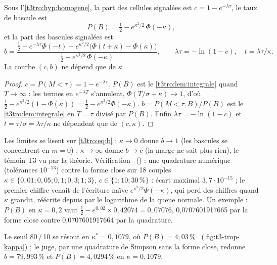 \begin{theoreme}\label{t3tro:thm:garde}
Sous l'\cref{t3tro:hyp:homogene}, la part des cellules signalées est $c = 1 - e^{-\lambda\tau}$, le taux de bascule est
\begin{equation}\label{t3tro:eq:pb}
P(B) = \tfrac12 - e^{\kappa^2/2}\,\Phi(-\kappa),
\end{equation}
et la part des bascules signalées est
\begin{equation}\label{t3tro:eq:b}
b = \frac{\tfrac12 - e^{-\lambda\tau}\Phi(-t) - e^{\kappa^2/2}\bigl(\Phi(t + \kappa) - \Phi(\kappa)\bigr)}{\tfrac12 - e^{\kappa^2/2}\,\Phi(-\kappa)}, \qquad \lambda\tau = -\ln(1 - c),\quad t = \lambda\tau/\kappa .
\end{equation}
La courbe $(c, b)$ ne dépend que de $\kappa$.
\end{theoreme}
\begin{proof}
$c = P(M < \tau) = 1 - e^{-\lambda\tau}$. $P(B)$ est le \cref{t3tro:lem:integrale} quand $T \to \infty$ : les termes en $e^{-\lambda T}$ s'annulent, $\Phi(T/\sigma + \kappa) \to 1$, d'où $\tfrac12 - e^{\kappa^2/2}(1 - \Phi(\kappa)) = \tfrac12 - e^{\kappa^2/2}\Phi(-\kappa)$. $b = P(M < \tau, B)/P(B)$ est le \cref{t3tro:lem:integrale} en $T = \tau$ divisé par $P(B)$. Enfin $\lambda\tau = -\ln(1 - c)$ et $t = \tau/\sigma = \lambda\tau/\kappa$ ne dépendent que de $(c, \kappa)$.
\end{proof}
Les limites se lisent sur \eqref{t3tro:eq:b} : $\kappa \to 0$ donne $b \to 1$ (les bascules se concentrent en $m = 0$) ; $\kappa \to \infty$ donne $b \to c$ (la marge ne sait plus rien), le témoin T3 vu par la théorie. Vérification \calc~() : une quadrature numérique (tolérances $10^{-13}$) contre la forme close sur 18 couples $\kappa \in \{0{,}01 ; 0{,}05 ; 0{,}1 ; 0{,}3 ; 1 ; 3\}$, $c \in \{1 ; 10 ; 30\,\%\}$ : écart maximal  $3{,}7 \cdot 10^{-15}$ ; le premier chiffre venait de l'écriture naïve $e^{\kappa^2/2}\Phi(-\kappa)$, qui perd des chiffres quand $\kappa$ grandit, réécrite depuis par le logarithme de la queue normale. Un exemple : $P(B)$ en $\kappa = 0{,}2$ vaut $\tfrac12 - e^{0{,}02} \times 0{,}42074 = 0{,}07076$, 0,0707601917665 par la forme close contre 0,0707601917664 par la quadrature.

Le seuil 80\,/\,10 se résout en $\kappa^\ast = 0{,}1079$, où $P(B) = 4{,}03\,\%$ \calc~(\cref{fig:t3-trop-kappa}) ; le juge, par une quadrature de Simpson sans la forme close, redonne $b = 79{,}993\,\%$ et $P(B) = 4{,}0294\,\%$ en $\kappa = 0{,}1079$.

